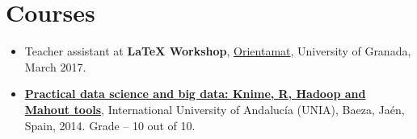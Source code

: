 \documentclass[10pt,a4paper,sans]{moderncv} %
\begin{document}

\vspace*{-2mm}
\section{Courses}

\begin{itemize}
\item Teacher assistant at \textbf{LaTeX Workshop}, \textcolor{color1}{\href{http://www.ugr.es/~orientamat/edicion4.html}{Orientamat}}, University of Granada, March 2017. 
 
\item \href{http://blogs.unia.es/uniatv/archives/2571}{\textbf{Practical data science and big data: Knime, R, Hadoop and Mahout tools}}, International University of Andalucía (UNIA), Baeza, Ja\'en, Spain, 2014. Grade -- 10 out of 10.
\end{itemize}






\end{document}
